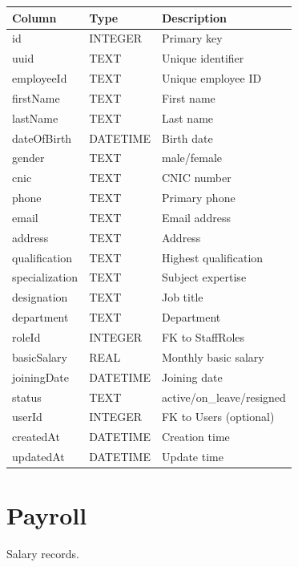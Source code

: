 \documentclass[12pt,a4paper]{report}
\begin{document}
\begin{longtable}{@{}p{4cm}p{2.5cm}p{6.5cm}@{}}
\toprule
\textbf{Column} & \textbf{Type} & \textbf{Description} \\
\midrule
\endhead
id & INTEGER & Primary key \\
uuid & TEXT & Unique identifier \\
employeeId & TEXT & Unique employee ID \\
firstName & TEXT & First name \\
lastName & TEXT & Last name \\
dateOfBirth & DATETIME & Birth date \\
gender & TEXT & male/female \\
cnic & TEXT & CNIC number \\
phone & TEXT & Primary phone \\
email & TEXT & Email address \\
address & TEXT & Address \\
qualification & TEXT & Highest qualification \\
specialization & TEXT & Subject expertise \\
designation & TEXT & Job title \\
department & TEXT & Department \\
roleId & INTEGER & FK to StaffRoles \\
basicSalary & REAL & Monthly basic salary \\
joiningDate & DATETIME & Joining date \\
status & TEXT & active/on\_leave/resigned \\
userId & INTEGER & FK to Users (optional) \\
createdAt & DATETIME & Creation time \\
updatedAt & DATETIME & Update time \\
\bottomrule
\end{longtable}

\section{Payroll}

Salary records.
\end{document}
